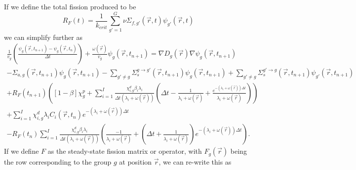 \documentclass[12pt]{report}
\begin{document}
	If we define the total fission produced to be
	\begin{equation}
	R_F(t) = \frac{1}{k_{crit}} \sum_{g'=1}^{G} \nu \Sigma_{f,g'}(\vec{r},t) \psi_{g'}(\vec{r},t)
	\end{equation}
	we can simplify further as	
	\begin{eqnarray}
	\frac{1}{v_g} \left(\frac{\psi_g(\vec{r},t_{n+1}) - \psi_g(\vec{r},t_{n})}{\Delta t} \right) + \frac{\omega(\vec{r})}{v_g} \psi_g(\vec{r},t_{n+1})  = \nabla D_g(\vec{r}) \nabla \psi_g(\vec{r},t_{n+1}) \nonumber \\ - \Sigma_{a,g}(\vec{r},t_{n+1}) \psi_g(\vec{r},t_{n+1}) -   \sum_{g'\neq g} \Sigma_{s}^{g\rightarrow g'} (\vec{r},t_{n+1}) \psi_g(\vec{r},t_{n+1}) + \sum_{g' \neq g} \Sigma_{s}^{g'\rightarrow g} (\vec{r},t_{n+1}) \psi_{g'}(\vec{r},t_{n+1}) \nonumber \\
	+ R_F(t_{n+1}) \left(\left[ 1- \beta \right] \chi_g^p + \sum_{i=1}^{I} \frac{\chi_{i,g}^d \beta_i \lambda_i}{\Delta t \left( \lambda_i + \omega(\vec{r}) \right)} \left( \Delta t - \frac{1}{\lambda_i + \omega(\vec{r})} + \frac{e^{-\left( \lambda_i + \omega(\vec{r})\right) \Delta t}}{\lambda_i + \omega(\vec{r})}\right) \right) \nonumber \\ +  \sum_{i=1}^{I} \chi_{i,g}^d \lambda_i C_i(\vec{r},t_{n}) e^{-\left(\lambda_i + \omega(\vec{r})\right) \Delta t} \nonumber \\
	-  R_F(t_{n}) \sum_{i=1}^{I} \frac{\chi_{i,g}^d \beta_i \lambda_i}{\Delta t \left( \lambda_i + \omega(\vec{r}) \right)} \left( \frac{-1}{\lambda_i + \omega(\vec{r})} + \left(\Delta t + \frac{1}{\lambda_i + \omega(\vec{r})} \right)e^{-\left(\lambda_i + \omega(\vec{r}) \right) \Delta t} \right)
	\nonumber.
	\end{eqnarray}
	If we define $F$ as the steady-state fission matrix or operator, with $F_g(\vec{r})$ being the row corresponding to the group $g$ at position $\vec{r}$, we can re-write this as
\end{document}
